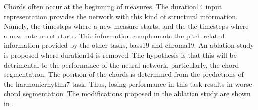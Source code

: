 
Chords often occur at the beginning of measures. The
\gls{duration14} input representation provides the network
with this kind of structural information. Namely, the
timesteps where a new measure starts, and the the timesteps
where a new note onset starts. This information complements
the pitch-related information provided by the other tasks,
\gls{bass19} and \gls{chroma19}. An ablation study is
proposed where \gls{duration14} is removed. The hypothesis
is that this will be detrimental to the performance of the
neural network, particularly, the chord segmentation. The
position of the chords is determined from the predictions of
the \gls{harmonicrhythm7} task. Thus, losing performance in
this task results in worse chord segmentation. The
modifications proposed in the ablation study are shown in
.

